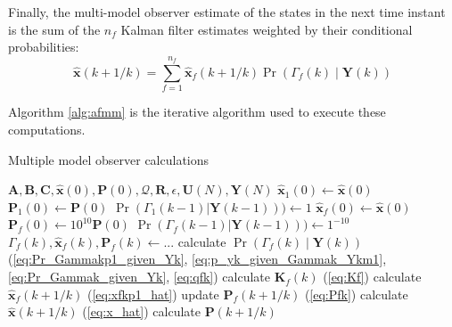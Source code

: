 Finally, the multi-model observer estimate of the states in the next time instant is the sum of the $n_f$ Kalman filter estimates weighted by their conditional probabilities:
\begin{equation} \label{eq:x_hat}
	\mathbf{\hat{x}}(k+1/k) = \sum_{f=1}^{n_f} \mathbf{\hat{x}}_f(k+1/k) \Pr(\Gamma_f(k) \mid \mathbf{Y}(k))
\end{equation}

Algorithm \ref{alg:afmm} is the iterative algorithm used to execute these computations.

\begin{algorithm}
	\caption{Multiple model observer calculations}  \label{alg:afmm}
	\begin{algorithmic}
			\Require $\mathbf{A},\mathbf{B},\mathbf{C},\mathbf{\hat{x}}(0), \mathbf{P}(0), \mathcal{Q}, \mathbf{R}, \epsilon, \mathbf{U}(N), \mathbf{Y}(N)$
			\State $\mathbf{\hat{x}}_1(0) \gets \mathbf{\hat{x}}(0)$    %
			\State $\mathbf{P}_1(0) \gets \mathbf{P}(0)$
			\State $\Pr(\Gamma_1(k-1)|\mathbf{Y}(k-1))) \gets 1$
			\State $\mathbf{\hat{x}}_f(0) \gets \mathbf{\hat{x}}(0)$
			\State $\mathbf{P}_f(0) \gets 10^{10}\mathbf{P}(0)$
			\State $\Pr(\Gamma_f(k-1)|\mathbf{Y}(k-1))) \gets 1^{-10}$
			\EndFor
			\State $\Gamma_f(k), \mathbf{\hat{x}}_f(k), \mathbf{P}_f(k) \gets ...$   %
			\State calculate $\Pr(\Gamma_f(k) \mid \mathbf{Y}(k))$ (\ref{eq:Pr_Gammakp1_given_Yk}, \ref{eq:p_yk_given_Gammak_Ykm1}, \ref{eq:Pr_Gammak_given_Yk}, \ref{eq:qfk})
			\State calculate $\mathbf{K}_f(k)$ (\ref{eq:Kf}) 
			\State calculate $\mathbf{\hat{x}}_f(k+1/k)$ (\ref{eq:xfkp1_hat})
			\State update $\mathbf{P}_f(k+1/k)$ (\ref{eq:Pfk})
			\EndFor
			\State calculate $\mathbf{\hat{x}}(k+1/k)$ (\ref{eq:x_hat}) 
			\State calculate $\mathbf{P}(k+1/k)$   %
			\EndFor
		\end{algorithmic}
\end{algorithm}

